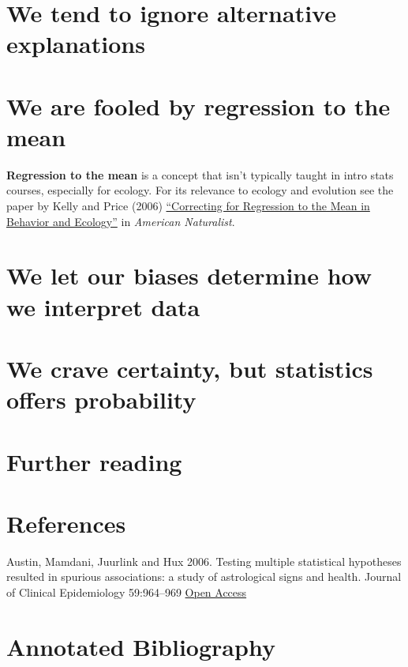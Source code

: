 \documentclass[]{book}
\theoremstyle{definition}
\theoremstyle{definition}
\theoremstyle{definition}
\theoremstyle{remark}
\begin{document}
\section{We tend to ignore alternative
explanations}\label{we-tend-to-ignore-alternative-explanations}

\section{We are fooled by regression to the
mean}\label{we-are-fooled-by-regression-to-the-mean}

\textbf{Regression to the mean} is a concept that isn't typically taught
in intro stats courses, especially for ecology. For its relevance to
ecology and evolution see the paper by Kelly and Price (2006)
\href{https://www.journals.uchicago.edu/doi/abs/10.1086/497402}{``Correcting
for Regression to the Mean in Behavior and Ecology''} in \emph{American
Naturalist}.

\section{We let our biases determine how we interpret
data}\label{we-let-our-biases-determine-how-we-interpret-data}

\section{We crave certainty, but statistics offers
probability}\label{we-crave-certainty-but-statistics-offers-probability}

\section{Further reading}\label{further-reading}

\section{References}\label{references}

Austin, Mamdani, Juurlink and Hux 2006. Testing multiple statistical
hypotheses resulted in spurious associations: a study of astrological
signs and health. Journal of Clinical Epidemiology 59:964--969
\href{https://www.jclinepi.com/article/S0895-4356(06)00124-7/abstract?code=jce-site}{Open
Access}

\section{Annotated Bibliography}\label{annotated-bibliography}
\end{document}
